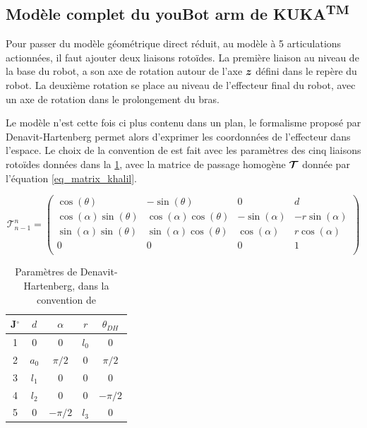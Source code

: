 \begin{appendices}
	\section{Modèle complet du youBot arm de KUKA\textsuperscript{TM}} \label{app_direct_kinem_sub_5}
	
	Pour passer du modèle géométrique direct réduit, au modèle à 5 articulations actionnées, il faut ajouter deux liaisons rotoïdes. La première liaison au niveau de la base du robot, a son axe de rotation autour de l'axe $ \vect{z} $ défini dans le repère du robot. La deuxième rotation se place au niveau de l'effecteur final du robot, avec un axe de rotation dans le prolongement du bras. 
	
	Le modèle n'est cette fois ci plus contenu dans un plan, le formalisme proposé par Denavit-Hartenberg permet alors d'exprimer les coordonnées de l'effecteur dans l'espace. Le choix de la convention de \textcite{khalil_new_1986} est fait avec les paramètres des cinq liaisons rotoïdes données dans la \cref{tab_DH_params}, avec la matrice de passage homogène $ \matrCal{T} $ donnée par l'équation \cref{eq_matrix_khalil}.
	
	\begin{equation} \label{eq_matrix_khalil}
	\mathcal{T}_{n-1}^n = 
		\begin{pmatrix}
			\cos(\theta) & -\sin(\theta) & 0 & d \\
			\cos(\alpha)\sin(\theta) & \cos(\alpha)\cos(\theta) & -\sin(\alpha) & -r\sin(\alpha) \\
			\sin(\alpha)\sin(\theta) & \sin(\alpha)\cos(\theta) & \cos(\alpha) & r\cos(\alpha) \\
			0 & 0 & 0 & 1 \\
		\end{pmatrix}
	\end{equation}
	
	\begin{table}[htbp] 
		\begin{center}
			\begin{tabular}{|c|c|c|c|c|}
				\hline
				J$^{\circ}$ & $ d $ & $ \alpha $ & $ r $ & $ \theta_{DH} $ \\
				\hline
				1 & 0    & 0        & $l_0$ & 0\\
				2 & $a_0$& $\pi/2$  & 0     & $\pi/2$\\
				3 & $l_1$& 0        & 0     & 0 \\
				4 & $l_2$& 0        & 0     & $-\pi/2$\\
				5 & 0    & $-\pi/2$ & $l_3$ & 0\\
				\hline
			\end{tabular}
		\end{center}
		\caption{Paramètres de Denavit-Hartenberg, dans la convention de \textcite{khalil_new_1986}}
		\label{tab_DH_params}	
	\end{table}
	

\end{appendices}
